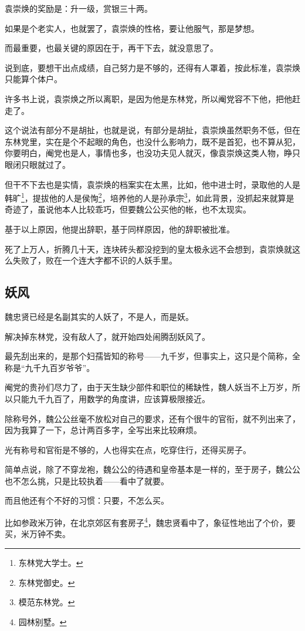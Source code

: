 \begin{multicols}{\theparacolNo}
		袁崇焕的奖励是：升一级，赏银三十两。

		如果是个老实人，也就罢了，袁崇焕的性格，要让他服气，那是梦想。

		而最重要，也最关键的原因在于，再干下去，就没意思了。

		说到底，要想干出点成绩，自己努力是不够的，还得有人罩着，按此标准，袁崇焕只能算个体户。

		许多书上说，袁崇焕之所以离职，是因为他是东林党，所以阉党容不下他，把他赶走了。

		这个说法有部分不是胡扯，也就是说，有部分是胡扯，袁崇焕虽然职务不低，但在东林党里，实在是个不起眼的角色，也没什么影响力，既不是首犯，也不算从犯，你要明白，阉党也是人，事情也多，也没功夫见人就灭，像袁崇焕这类人物，睁只眼闭只眼就过了。

		但干不下去也是实情，袁崇焕的档案实在太黑，比如，他中进士时，录取他的人是韩旷\footnote{东林党大学士。}，提拔他的人是侯恂\footnote{东林党御史。}，培养他的人是孙承宗\footnote{模范东林党。}，如此背景，没抓起来就算是奇迹了，虽说他本人比较乖巧，但要魏公公买他的帐，也不太现实。

		基于以上原因，他提出辞职，基于同样原因，他的辞职被批准。

		死了上万人，折腾几十天，连块砖头都没挖到的皇太极永远不会想到，袁崇焕就这么失败了，败在一个连大字都不识的人妖手里。

		\subsection{妖风}
		魏忠贤已经是名副其实的人妖了，不是人，而是妖。

		解决掉东林党，没有敌人了，就开始四处闹腾刮妖风了。

		最先刮出来的，是那个妇孺皆知的称号——九千岁，但事实上，这只是个简称，全称是“九千九百岁爷爷”。

		阉党的贵孙们尽力了，由于天生缺少部件和职位的稀缺性，魏人妖当不上万岁，所以只能九千九百了，用数学的角度讲，应该算极限接近。

		除称号外，魏公公丝毫不放松对自己的要求，还有个很牛的官衔，就不列出来了，因为我算了一下，总计两百多字，全写出来比较麻烦。

		光有称号和官衔是不够的，人也得实在点，吃穿住行，还得买房子。

		简单点说，除了不穿龙袍，魏公公的待遇和皇帝基本是一样的，至于房子，魏公公也不怎么挑，只是比较执着——看中了就要。

		而且他还有个不好的习惯：只要，不怎么买。

		比如参政米万钟，在北京郊区有套房子\footnote{园林别墅。}，魏忠贤看中了，象征性地出了个价，要买，米万钟不卖。


\end{multicols}
